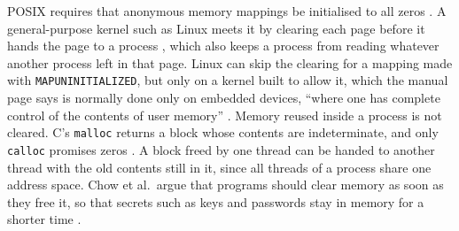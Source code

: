 \documentclass[12pt]{report}
\renewcommand{\_}{\origunderscore\allowbreak}
\begin{document}
POSIX requires that anonymous memory mappings be initialised to all zeros \cite{posix2024mmap}. A general-purpose kernel such as Linux meets it by clearing each page before it hands the page to a process \cite{linux-mmap-man}, which also keeps a process from reading whatever another process left in that page. Linux can skip the clearing for a mapping made with \texttt{MAP\_UNINITIALIZED}, but only on a kernel built to allow it, which the manual page says is normally done only on embedded devices, ``where one has complete control of the contents of user memory'' \cite{linux-mmap-man}. Memory reused inside a process is not cleared. C's \texttt{malloc} returns a block whose contents are indeterminate, and only \texttt{calloc} promises zeros \cite{iso-c11,linux-malloc-man}. A block freed by one thread can be handed to another thread with the old contents still in it, since all threads of a process share one address space. Chow et al.\ argue that programs should clear memory as soon as they free it, so that secrets such as keys and passwords stay in memory for a shorter time \cite{chow2005shredding}.
\end{document}
